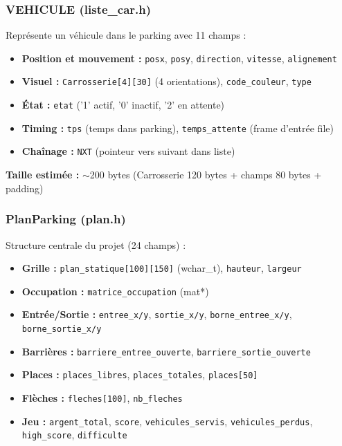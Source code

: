 \documentclass[12pt,a4paper]{article}
\begin{document}
\subsubsection{VEHICULE (liste\_car.h)}

Représente un véhicule dans le parking avec 11 champs :

\begin{itemize}
    \item \textbf{Position et mouvement :} \texttt{posx}, \texttt{posy}, \texttt{direction}, \texttt{vitesse}, \texttt{alignement}
    \item \textbf{Visuel :} \texttt{Carrosserie[4][30]} (4 orientations), \texttt{code\_couleur}, \texttt{type}
    \item \textbf{État :} \texttt{etat} ('1' actif, '0' inactif, '2' en attente)
    \item \textbf{Timing :} \texttt{tps} (temps dans parking), \texttt{temps\_attente} (frame d'entrée file)
    \item \textbf{Chaînage :} \texttt{NXT} (pointeur vers suivant dans liste)
\end{itemize}

\textbf{Taille estimée :} $\sim$200 bytes (Carrosserie 120 bytes + champs 80 bytes + padding)

\subsubsection{PlanParking (plan.h)}

Structure centrale du projet (24 champs) :

\begin{itemize}
    \item \textbf{Grille :} \texttt{plan\_statique[100][150]} (wchar\_t), \texttt{hauteur}, \texttt{largeur}
    \item \textbf{Occupation :} \texttt{matrice\_occupation} (mat*)
    \item \textbf{Entrée/Sortie :} \texttt{entree\_x/y}, \texttt{sortie\_x/y}, \texttt{borne\_entree\_x/y}, \texttt{borne\_sortie\_x/y}
    \item \textbf{Barrières :} \texttt{barriere\_entree\_ouverte}, \texttt{barriere\_sortie\_ouverte}
    \item \textbf{Places :} \texttt{places\_libres}, \texttt{places\_totales}, \texttt{places[50]}
    \item \textbf{Flèches :} \texttt{fleches[100]}, \texttt{nb\_fleches}
    \item \textbf{Jeu :} \texttt{argent\_total}, \texttt{score}, \texttt{vehicules\_servis}, \texttt{vehicules\_perdus}, \texttt{high\_score}, \texttt{difficulte}
\end{itemize}
\end{document}
